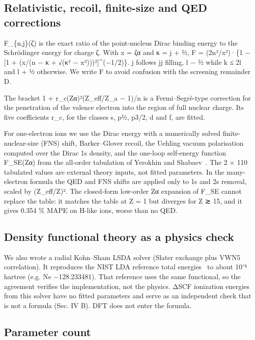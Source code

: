 \documentclass[aps,pra,preprint,superscriptaddress,amsmath,amssymb]{revtex4-2}
\begin{document}
\subsection{Relativistic, recoil, finite-size and QED corrections}

F\_\{n,j\}(ζ) is the exact ratio of the point-nucleus Dirac binding energy to the Schrödinger energy for charge ζ. With x = ζα and κ = j + ½, F = (2n²/x²)·\{1 − [1 + (x/(n − κ + √(κ² − x²)))²]\textasciicircum{}(−1/2)\}. j follows jj filling, l − ½ while k ≤ 2l and l + ½ otherwise. We write F to avoid confusion with the screening remainder D.


The bracket 1 + r\_c(Zα)²(Z\_eff/Z\_a − 1)/n is a Fermi–Segrè-type correction for the penetration of the valence electron into the region of full nuclear charge. Its five coefficients r\_c, for the classes s, p½, p3/2, d and f, are fitted.


For one-electron ions we use the Dirac energy with a numerically solved finite-nuclear-size (FNS) shift, Barker–Glover recoil, the Uehling vacuum polarisation computed over the Dirac 1s density, and the one-loop self-energy function F\_SE(Zα) from the all-order tabulation of Yerokhin and Shabaev~\cite{r31}. The 2 × 110 tabulated values are external theory inputs, not fitted parameters. In the many-electron formula the QED and FNS shifts are applied only to 1s and 2s removal, scaled by (Z\_eff/Z)². The closed-form low-order Zα expansion of F\_SE cannot replace the table: it matches the table at Z = 1 but diverges for Z ≳ 15, and it gives 0.354 \% MAPE on H-like ions, worse than no QED.


\subsection{Density functional theory as a physics check}

We also wrote a radial Kohn–Sham LSDA solver (Slater exchange plus VWN5 correlation). It reproduces the NIST LDA reference total energies~\cite{r28} to about 10⁻⁶ hartree (e.g. Ne −128.233481). That reference uses the same functional, so the agreement verifies the implementation, not the physics. ΔSCF ionization energies from this solver have no fitted parameters and serve as an independent check that is not a formula (Sec. IV B). DFT does not enter the formula.


\subsection{Parameter count}
\end{document}
